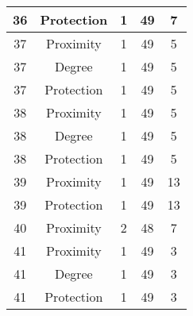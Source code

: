 \documentclass[results.tex]{subfiles}
\begin{document}
\begin{center}
\begin{tabular}{| c || c | c | c | c |}
            \hline
            36                      & Protection                   & 1                      & 49                      & 7                    \\
            \hline
            37                      & Proximity                    & 1                      & 49                      & 5                    \\
            \hline
            37                      & Degree                       & 1                      & 49                      & 5                    \\
            \hline
            37                      & Protection                   & 1                      & 49                      & 5                    \\
            \hline
            38                      & Proximity                    & 1                      & 49                      & 5                    \\
            \hline
            38                      & Degree                       & 1                      & 49                      & 5                    \\
            \hline
            38                      & Protection                   & 1                      & 49                      & 5                    \\
            \hline
            39                      & Proximity                    & 1                      & 49                      & 13                   \\
            \hline
            39                      & Protection                   & 1                      & 49                      & 13                   \\
            \hline
            40                      & Proximity                    & 2                      & 48                      & 7                    \\
            \hline
            41                      & Proximity                    & 1                      & 49                      & 3                    \\
            \hline
            41                      & Degree                       & 1                      & 49                      & 3                    \\
            \hline
            41                      & Protection                   & 1                      & 49                      & 3                    \\

\end{tabular}
\end{center}
\end{document}
